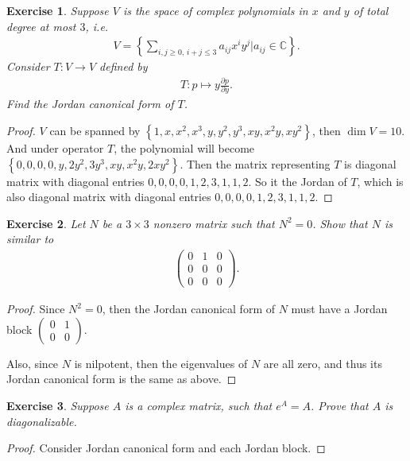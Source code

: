 \documentclass[11pt]{book}
\newtheorem{exercise}{Exercise}[section]
\theoremstyle{definition}
\numberwithin{equation}{chapter}
\begin{document}
\medskip

\begin{exercise}
Suppose $V$ is the space of complex polynomials in $x$ and $y$ of total degree at most $3$, i.e.
\begin{align*}
    V = \left\{\sum_{i,j \geq 0,\,i+j \leq 3} a_{ij} x^i y^j \Bigg| a_{ij} \in \mathbb{C} \right\}.
\end{align*}
Consider $T: V \to V$ defined by 
\begin{align*}
    T: p \mapsto y \frac{\partial p}{\partial y}.
\end{align*}
Find the Jordan canonical form of $T$.
\end{exercise}
\begin{proof}
$V$ can be spanned by $\left\{1, x, x^2, x^3, y, y^2, y^3, xy, x^2y, xy^2\right\}$, then $\dim V = 10$. And under operator $T$, the polynomial will become $\left\{0, 0, 0, 0, y, 2y^2, 3y^3, xy, x^2y, 2xy^2\right\}$. Then the matrix representing $T$ is diagonal matrix with diagonal entries $0,0,0,0,1,2,3,1,1,2$. So it the Jordan of $T$, which is also diagonal matrix with diagonal entries $0,0,0,0,1,2,3,1,1,2$.
\end{proof}


\medskip

\begin{exercise}
Let $N$ be a $3 \times 3$ nonzero matrix such that $N^2 = 0$. Show that $N$ is similar to
\begin{align*}
    \begin{pmatrix}
        0 & 1 & 0 \\
        0 & 0 & 0 \\
        0 & 0 & 0
    \end{pmatrix}.
\end{align*}
\end{exercise}
\begin{proof}
Since $N^2 = 0$, then the Jordan canonical form of $N$ must have a Jordan block $\begin{pmatrix}
    0 & 1 \\
    0 & 0 
\end{pmatrix}$.

Also, since $N$ is nilpotent, then the eigenvalues of $N$ are all zero, and thus its Jordan canonical form is the same as above. 
\end{proof}

\medskip

\begin{exercise}
Suppose $A$ is a complex matrix, such that $e^A = A$. Prove that $A$ is diagonalizable.
\end{exercise}
\begin{proof}
Consider Jordan canonical form and each Jordan block.
\end{proof}
\end{document}
